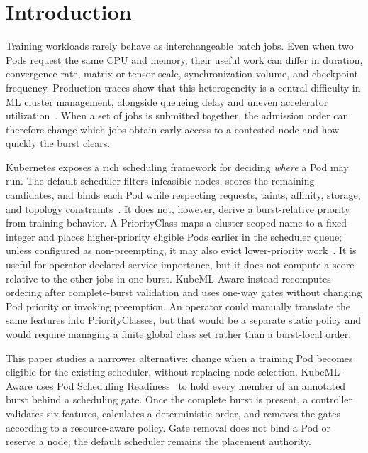 \documentclass[10pt,journal,compsoc]{IEEEtran}
\newcommand{\system}{KubeML-Aware}
\begin{document}
\section{Introduction}

Training workloads rarely behave as interchangeable batch jobs. Even when two Pods request the same CPU and memory, their useful work can differ in duration, convergence rate, matrix or tensor scale, synchronization volume, and checkpoint frequency. Production traces show that this heterogeneity is a central difficulty in ML cluster management, alongside queueing delay and uneven accelerator utilization~\cite{weng2022mlaas}. When a set of jobs is submitted together, the admission order can therefore change which jobs obtain early access to a contested node and how quickly the burst clears.

Kubernetes exposes a rich scheduling framework for deciding \emph{where} a Pod may run. The default scheduler filters infeasible nodes, scores the remaining candidates, and binds each Pod while respecting requests, taints, affinity, storage, and topology constraints~\cite{kubernetesSchedulingFramework}. It does not, however, derive a burst-relative priority from training behavior. A PriorityClass maps a cluster-scoped name to a fixed integer and places higher-priority eligible Pods earlier in the scheduler queue; unless configured as non-preempting, it may also evict lower-priority work~\cite{kubernetesPriority}. It is useful for operator-declared service importance, but it does not compute a score relative to the other jobs in one burst. \system{} instead recomputes ordering after complete-burst validation and uses one-way gates without changing Pod priority or invoking preemption. An operator could manually translate the same features into PriorityClasses, but that would be a separate static policy and would require managing a finite global class set rather than a burst-local order.

This paper studies a narrower alternative: change when a training Pod becomes eligible for the existing scheduler, without replacing node selection. \system{} uses Pod Scheduling Readiness~\cite{kubernetesSchedulingReadiness} to hold every member of an annotated burst behind a scheduling gate. Once the complete burst is present, a controller validates six features, calculates a deterministic order, and removes the gates according to a resource-aware policy. Gate removal does not bind a Pod or reserve a node; the default scheduler remains the placement authority.
\end{document}
